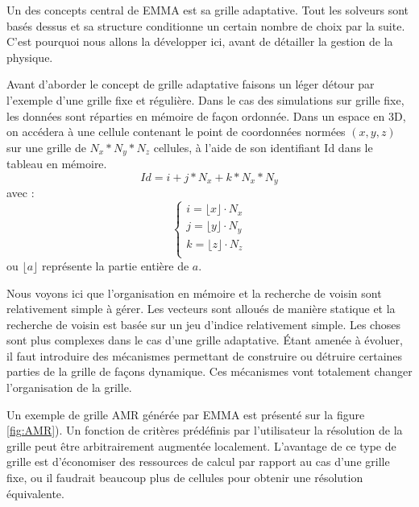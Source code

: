 Un des concepts central de EMMA est sa grille adaptative.
Tout les solveurs sont basés dessus et sa structure conditionne un certain nombre de choix par la suite.
C'est pourquoi nous allons la développer ici, avant de détailler la gestion de la physique. 

Avant d'aborder le concept de grille adaptative faisons un léger détour par l'exemple d'une grille fixe et régulière.
Dans le cas des simulations sur grille fixe, les données sont réparties en mémoire de façon ordonnée.
Dans un espace en 3D, on accédera à une cellule contenant le point de coordonnées normées $(x,y,z)$ sur une grille de $N_x*N_y*N_z$ cellules, à l'aide de son identifiant Id dans le tableau en mémoire.
\begin{equation}
Id = i + j*N_x + k * N_x*N_y
\end{equation}
avec :
\begin{equation}
\begin{cases}
i=\lfloor x \rfloor \cdot N_x \\
j=\lfloor y \rfloor \cdot N_y \\
k=\lfloor z \rfloor \cdot N_z \\
\end{cases}
\end{equation}
ou $\lfloor a \rfloor$ représente la partie entière de $a$.

Nous voyons ici que l'organisation en mémoire et la recherche de voisin sont relativement simple à gérer.
Les vecteurs sont alloués de manière statique et la recherche de voisin est basée sur un jeu d'indice relativement simple.
Les choses sont plus complexes dans le cas d'une grille adaptative.
Étant amenée à évoluer, il faut introduire des mécanismes permettant de construire ou détruire certaines parties de la grille de façons dynamique.
Ces mécanismes vont totalement changer l'organisation de la grille.

Un exemple de grille \ac{AMR} générée par EMMA est présenté sur la figure \ref{fig:AMR}).
Un fonction de critères prédéfinis par l'utilisateur la résolution de la grille peut être arbitrairement augmentée localement.
L'avantage de ce type de grille est d'économiser des ressources de calcul par rapport au cas d'une grille fixe, ou il faudrait beaucoup plus de cellules pour obtenir une résolution équivalente.

